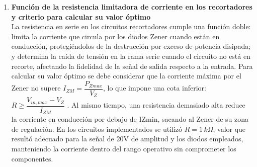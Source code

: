 \begin{enumerate}[leftmargin=*, label=\textbf{\arabic*.}]
    \item \textbf{Función de la resistencia limitadora de corriente en los recortadores y criterio para calcular su valor óptimo}\\
    La resistencia en serie en los circuitos recortadores cumple una función doble: limita la corriente que circula por los diodos Zener cuando están en conducción, protegiéndolos de la destrucción por exceso de potencia disipada; y determina la caída de tensión en la rama serie cuando el circuito no está en recorte, afectando la fidelidad de la señal de salida respecto a la entrada. Para calcular su valor óptimo se debe considerar que la corriente máxima por el Zener no supere $I_{ZM}=\dfrac{P_{Zmax}}{V_Z}$, lo que impone una cota inferior: $R \geq \dfrac{V_{in,max}-V_Z}{I_{ZM}}$ . Al mismo tiempo, una resistencia demasiado alta reduce la corriente en conducción por debajo de IZmin, sacando al Zener de su zona de regulación. En los circuitos implementados se utilizó $R=1\,k\Omega$, valor que resultó adecuado para la señal de 20V de amplitud y los diodos empleados, manteniendo la corriente dentro del rango operativo sin comprometer los componentes.

\end{enumerate}
 
